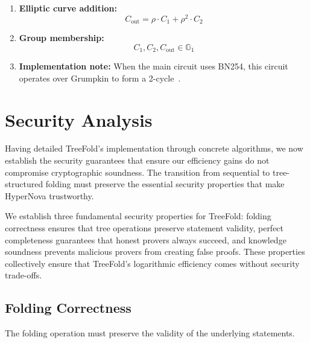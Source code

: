 \documentclass[11pt,a4paper]{article}
\theoremstyle{plain}
\theoremstyle{definition}
\newcommand{\G}{\mathbb{G}}
\begin{document}
\begin{tcolorbox}[title=Elliptic Curve Circuit Constraints]
\begin{enumerate}[itemsep=5pt]
\item \textbf{Elliptic curve addition:}
\begin{equation}
C_{\text{out}} = \rho \cdot C_1 + \rho^2 \cdot C_2
\end{equation}

\item \textbf{Group membership:}
\begin{equation}
C_1, C_2, C_{\text{out}} \in \G_1
\end{equation}

\item \textbf{Implementation note:} 
When the main circuit uses BN254, this circuit operates over Grumpkin to form a 2-cycle~\cite{cyclefold}.
\end{enumerate}
\end{tcolorbox}


\section{Security Analysis}

Having detailed TreeFold's implementation through concrete algorithms, we now establish the security guarantees that ensure our efficiency gains do not compromise cryptographic soundness. The transition from sequential to tree-structured folding must preserve the essential security properties that make HyperNova trustworthy.

We establish three fundamental security properties for TreeFold: folding correctness ensures that tree operations preserve statement validity, perfect completeness guarantees that honest provers always succeed, and knowledge soundness prevents malicious provers from creating false proofs. These properties collectively ensure that TreeFold's logarithmic efficiency comes without security trade-offs.

\subsection{Folding Correctness}

The folding operation must preserve the validity of the underlying statements.
\end{document}
